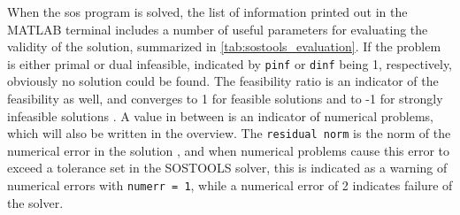 When the \gls{sos} program is solved, the list of information printed out in the MATLAB terminal includes a number of useful parameters for evaluating the validity of the solution, summarized in \autoref{tab:sostools_evaluation}.
If the problem is either primal or dual infeasible, indicated by \texttt{pinf} or \texttt{dinf} being 1, respectively, obviously no solution could be found. The feasibility ratio is an indicator of the feasibility as well, and converges to 1 for feasible solutions and to -1 for strongly infeasible solutions \citep{bib:feasratio}. A value in between is an indicator of numerical problems, which will also be written in the overview.
The \texttt{residual norm} is the norm of the numerical error in the solution \citep{bib:sostools_manual}, and when numerical problems cause this error to exceed a tolerance set in the SOSTOOLS solver, this is indicated  as a warning of numerical errors with \texttt{numerr = 1}, while a numerical error of 2 indicates failure of the solver.

%


